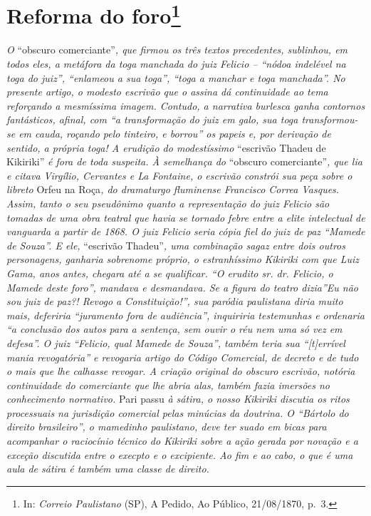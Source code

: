 \chapter{Reforma do foro\footnote{ In: \emph{Correio Paulistano} (SP), A Pedido, Ao Público,
  21/08/1870, p.~3.}} %

\begin{didascalia}
\emph{O} ``obscuro comerciante''\emph{, que firmou os três textos
precedentes, sublinhou, em todos eles, a metáfora da toga manchada do
juiz Felicio -- ``nódoa indelével na toga do juiz'', ``enlameou a sua
toga'', ``toga a manchar e toga manchada''. No presente artigo, o modesto
escrivão que o assina dá continuidade ao tema reforçando a mesmíssima
imagem. Contudo, a narrativa burlesca ganha contornos fantásticos,
afinal, com ``a transformação do juiz em galo, sua toga transformou-se em
cauda, roçando pelo tinteiro, e borrou'' os papeis e, por derivação de
sentido, a própria toga! A erudição do modestíssimo} ``escrivão Thadeu de
Kikiriki'' \emph{é fora de toda suspeita. À semelhança do} ``obscuro
comerciante''\emph{, que lia e citava Virgílio, Cervantes e La Fontaine,
o escrivão constrói sua peça sobre o libreto} Orfeu na Roça\emph{, do
dramaturgo fluminense Francisco Correa Vasques. Assim, tanto o seu
pseudônimo quanto a representação do juiz Felicio são tomadas de uma
obra teatral que havia se tornado febre entre a elite intelectual de
vanguarda a partir de 1868. O juiz Felicio seria cópia fiel do juiz de
paz ``Mamede de Souza''. E ele,} ``escrivão Thadeu''\emph{, uma combinação
sagaz entre dois outros personagens, ganharia sobrenome próprio, o
estranhíssimo Kikiriki com que Luiz Gama, anos antes, chegara até a se
qualificar. ``O erudito sr. dr. Felicio, o Mamede deste foro'', mandava e
desmandava. Se a figura do teatro dizia''Eu não sou juiz de paz?! Revogo
a Constituição!'', sua paródia paulistana diria muito mais, deferiria
``juramento fora de audiência'', inquiriria testemunhas e ordenaria ``a
conclusão dos autos para a sentença, sem ouvir o réu nem uma só vez em
defesa''. O juiz ``Felicio, qual Mamede de Souza'', também teria sua
``{[}t{]}errível mania revogatória'' e revogaria artigo do Código
Comercial, de decreto e de tudo o mais que lhe calhasse revogar. A
criação original do obscuro escrivão, notória continuidade do
comerciante que lhe abria alas, também fazia imersões no conhecimento
normativo.} Pari passu \emph{à sátira, o nosso Kikiriki discutia os
ritos processuais na jurisdição comercial pelas minúcias da doutrina. O
``Bártolo do direito brasileiro'', o mamedinho paulistano, deve ter suado
em bicas para acompanhar o raciocínio técnico do Kikiriki sobre a ação
gerada por novação e a exceção discutida entre o execpto e o excipiente.
Ao fim e ao cabo, o que é uma aula de sátira é também uma classe de
direito.}
\end{didascalia}

